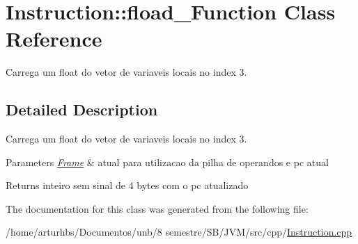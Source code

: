 \hypertarget{classInstruction_1_1fload__3Function}{}\section{Instruction\+:\+:fload\+\_\+Function Class Reference}
\label{classInstruction_1_1fload__3Function}


Carrega um float do vetor de variaveis locais no index 3.  




\subsection{Detailed Description}
Carrega um float do vetor de variaveis locais no index 3. 


\begin{DoxyParams}{Parameters}
{\em \hyperlink{classFrame}{Frame}} & atual para utilizacao da pilha de operandos e pc atual \\
\hline
\end{DoxyParams}
\begin{DoxyReturn}{Returns}
inteiro sem sinal de 4 bytes com o pc atualizado 
\end{DoxyReturn}


The documentation for this class was generated from the following file\+:\begin{DoxyCompactItemize}
\item 
/home/arturhbs/\+Documentos/unb/8 semestre/\+S\+B/\+J\+V\+M/src/cpp/\hyperlink{Instruction_8cpp}{Instruction.\+cpp}\end{DoxyCompactItemize}
